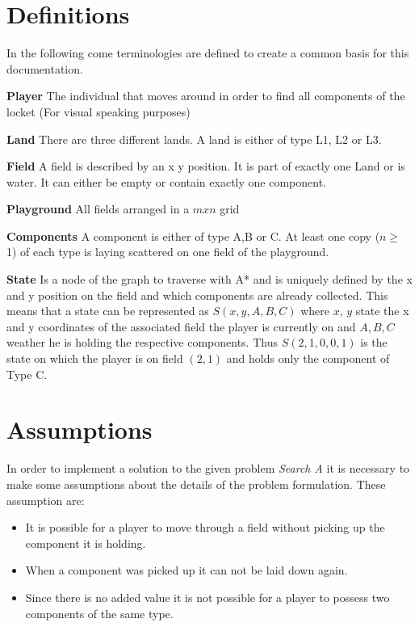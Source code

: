 \documentclass{article}
\begin{document}
\section{Definitions}
In the following come terminologies are defined to create a common basis for this documentation.
\begin{description}
    \item{\textbf{Player}} The individual that moves around in order to find all components of the locket (For visual speaking purposes)
    \item{\textbf{Land}} There are three different lands. A land is either of type L1, L2 or L3.
    \item{\textbf{Field}} A field is described by an x y position. It is part of exactly one Land or is water. It can either be empty or contain exactly one component.
    \item{\textbf{Playground}} All fields arranged in a $m x n$ grid
    \item{\textbf{Components}} A component is either of type A,B or C. At least one copy ($n \geq \ $1) of each type is laying scattered on one field of the playground.
    \item{\textbf{State}} \label{definition_state} Is a node of the graph to traverse with A* and is uniquely defined by the x and y position on the field and which components are already collected. 
    This means that a state can be represented as $S(x,y,A,B,C)$ where $x$, $y$ state the x and y coordinates of the associated field the player is currently on and $A, B, C$ weather he is holding the respective components. Thus $S(2,1,0,0,1)$ is the state on which the player is on field $(2,1)$ and holds only the component of Type C.
\end{description}

\section{Assumptions}
In order to implement a solution to the given problem \textit{Search A} it is necessary to make some assumptions about the details of the problem formulation. These assumption are:
\begin{itemize}
    \item It is possible for a player to move through a field without picking up the component it is holding. 
    \item When a component was picked up it can not be laid down again.
    \item Since there is no added value it is not possible for a player to possess two components of the same type.
\end{itemize}
\end{document}
